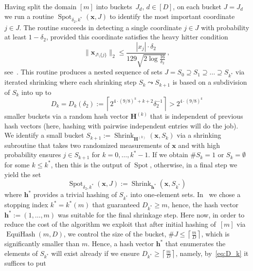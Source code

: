 \documentclass[12pt]{article}
\theoremstyle{plain}
\theoremstyle{definition}
\DeclareMathOperator{\EquiHash}{EquiHash}
\renewcommand{\vec}{\boldsymbol}
\DeclareMathOperator{\shrink}{Shrink}
\DeclareMathOperator{\spot}{Spot}
\begin{document}
Having split the domain $[m]$ into buckets~$J_d$, $d \in [D]$, on each bucket $J = J_d$ we run a routine $\spot_{\delta_2,k^\ast}(\vec{x},J)$ to identify the most important coordinate $j \in J$.
The routine succeeds in detecting a single coordinate $j \in J$
with probability at least $1-\delta_2$,
provided this coordinate satisfies the heavy hitter condition
\begin{equation} \label{eq:spotHHC}
    \|\vec{x}_{J \setminus \{j\}}\|_2
        \leq \frac{|x_j| \cdot \delta_2}{ 129\sqrt{2\log \frac{16}{\delta_2}}}\,,
\end{equation}
see~\cite[Lem~2.9 with Rem~2.10]{KW24b}.
This routine produces a nested sequence of sets
$J = S_0 \supseteq S_1 \supseteq \ldots \supseteq S_{k^\ast}$
via iterated shrinking
where each shrinking step $S_k \leadsto S_{k+1}$ is based on a subdivision of $S_k$ into up to
\begin{equation} \label{eq:D_k}
    D_k = D_k(\delta_2) := \left\lceil 2^{4 \cdot (9/8)^k + k+ 2} \delta_2^{-1} \right\rceil > 2^{4 \cdot (9/8)^k}
\end{equation}
smaller buckets via a random hash vector $\vec{H}^{(k)}$ that is independent of previous hash vectors (here, hashing with pairwise independent entries will do the job). We identify a small bucket $S_{k+1} := \shrink_{\vec{H}^{(k)}}(\vec{x},S_k)$ via a shrinking subroutine that takes two randomized measurements of $\vec{x}$ and with high probability ensures $j \in S_{k+1}$ for $k=0,\ldots,k^\ast - 1$.
If we obtain $\# S_k = 1$ or $S_k = \emptyset$ for some $k \leq k^\ast$, then this is the output of $\spot$,
otherwise, in a final step we yield the set
\begin{equation*}
    \spot_{\delta_2,k^\ast} (\vec{x},J) := \shrink_{\vec{h}^\ast}(\vec{x},S_{k^\ast})
\end{equation*}
where $\vec{h}^\ast$ provides a trivial hashing of $S_{k^\ast}$ into one-element sets.
In~\cite[eq~(11)]{KW24b} we chose a stopping index $k^\ast = k^\ast(m)$
that guaranteed $D_{k^\ast} \geq m$,
hence, the hash vector \mbox{$\vec{h}^\ast := (1,\ldots,m)$}
was suitable for the final shrinkage step.
Here now, in order to reduce the cost of the algorithm 
we exploit that after initial hashing of~$[m]$ via $\EquiHash(m,D)$,
we control the size of the bucket, $\# J \leq \left\lceil \frac{m}{D} \right\rceil$, which is significantly smaller than $m$. 
Hence, a hash vector $\vec{h}^\ast$ that enumerates the elements of $S_{k^\ast}$ will exist already
if we ensure $D_{k^\ast} \geq \left\lceil \frac{m}{D} \right\rceil$, namely, by~\eqref{eq:D_k} it suffices to put
\end{document}
